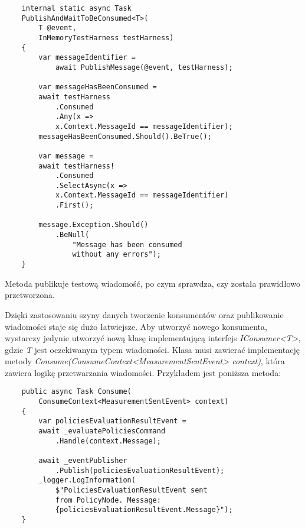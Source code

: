 \begin{addmargin}[0mm]{10mm}
\begin{lstlisting}
    internal static async Task 
    PublishAndWaitToBeConsumed<T>(
        T @event, 
        InMemoryTestHarness testHarness)
    {
        var messageIdentifier = 
            await PublishMessage(@event, testHarness);

        var messageHasBeenConsumed = 
        await testHarness
            .Consumed
            .Any(x => 
            x.Context.MessageId == messageIdentifier);
        messageHasBeenConsumed.Should().BeTrue();

        var message = 
        await testHarness!
            .Consumed
            .SelectAsync(x => 
            x.Context.MessageId == messageIdentifier)
            .First();

        message.Exception.Should()
            .BeNull(
                "Message has been consumed 
                without any errors");
    }
    \end{lstlisting}
\end{addmargin}

Metoda publikuje testową wiadomość, po czym sprawdza, czy została prawidłowo 
przetworzona. 

Dzięki zastosowaniu szyny danych tworzenie konsumentów oraz publikowanie wiadomości 
staje się dużo łatwiejsze. Aby utworzyć nowego konsumenta, wystarczy jedynie utworzyć 
nową klasę implementującą interfejs \textit{IConsumer<T>}, gdzie \textit{T} jest oczekiwanym typem 
wiadomości. Klasa musi zawierać implementację metody 
\textit{Consume(ConsumeContext<MeasurementSentEvent> context)}, która zawiera logikę 
przetwarzania wiadomości. Przykładem jest poniższa metoda:

\begin{addmargin}[0mm]{10mm}
\begin{lstlisting}
    public async Task Consume(
        ConsumeContext<MeasurementSentEvent> context)
    {
        var policiesEvaluationResultEvent = 
        await _evaluatePoliciesCommand
            .Handle(context.Message);

        await _eventPublisher
            .Publish(policiesEvaluationResultEvent);
        _logger.LogInformation(
            $"PoliciesEvaluationResultEvent sent 
            from PolicyNode. Message: 
            {policiesEvaluationResultEvent.Message}");
    }

    \end{lstlisting}
\end{addmargin}
    
